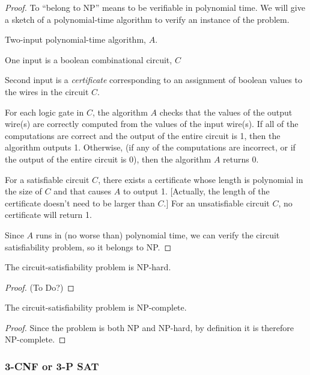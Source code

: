 \begin{proof}
	To ``belong to NP'' means to be verifiable in polynomial time.  We will give a sketch of a polynomial-time algorithm to verify an instance of the problem.  
	
	Two-input polynomial-time algorithm, $A$. 
	
	One input is a boolean combinational circuit, $C$  
	
	Second input is a {\it certificate} corresponding to an assignment of boolean values to the wires in the circuit $C$.
	
	  For each logic gate in $C$, the algorithm $A$ checks that the values of the output wire(s) are correctly computed from the values of the input wire(s).  If all of the computations are correct and the output of the entire circuit is 1, then the algorithm outputs 1.  Otherwise, (if any of the computations are incorrect, or if the output of the entire circuit is 0), then the algorithm $A$ returns 0.  
	  
	  For a satisfiable circuit $C$, there exists a certificate whose length is polynomial in the size of $C$ and that causes $A$ to output 1.   [Actually, the length of the certificate doesn't need to be larger than $C$.]  For an unsatisfiable circuit $C$, no certificate will return 1.  
	  
	  Since $A$ runs in (no worse than) polynomial time, we can verify the circuit satisfiability problem, so it belongs to NP.   
\end{proof}

\begin{lemma}
	The circuit-satisfiability problem is NP-hard.
\end{lemma}

\begin{proof}
	(To Do?)
\end{proof}

\begin{theorem}
	The circuit-satisfiability problem is NP-complete.
\end{theorem}

\begin{proof}
	Since the problem is both NP and NP-hard, by definition it is therefore NP-complete.
\end{proof}

\subsubsection{3-CNF or 3-P SAT}

